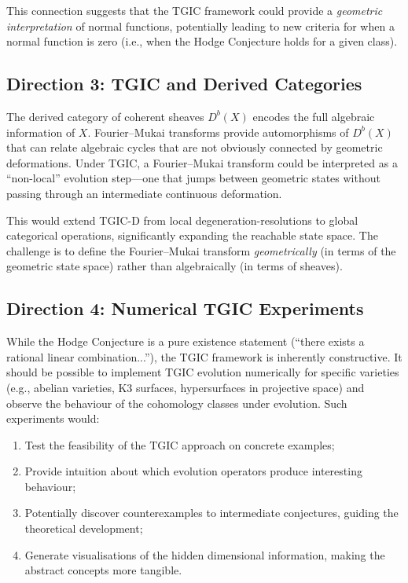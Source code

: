 \documentclass[11pt,a4paper]{article}
\theoremstyle{definition}
\theoremstyle{plain}
\begin{document}
This connection suggests that the TGIC framework could provide a \emph{geometric interpretation} of normal functions, potentially leading to new criteria for when a normal function is zero (i.e., when the Hodge Conjecture holds for a given class).

\subsection{Direction 3: TGIC and Derived Categories}

The derived category of coherent sheaves $D^b(X)$ encodes the full algebraic information of $X$. Fourier--Mukai transforms provide automorphisms of $D^b(X)$ that can relate algebraic cycles that are not obviously connected by geometric deformations. Under TGIC, a Fourier--Mukai transform could be interpreted as a ``non-local'' evolution step---one that jumps between geometric states without passing through an intermediate continuous deformation.

This would extend TGIC-D from local degeneration-resolutions to global categorical operations, significantly expanding the reachable state space. The challenge is to define the Fourier--Mukai transform \emph{geometrically} (in terms of the geometric state space) rather than algebraically (in terms of sheaves).

\subsection{Direction 4: Numerical TGIC Experiments}

While the Hodge Conjecture is a pure existence statement (``there exists a rational linear combination...''), the TGIC framework is inherently constructive. It should be possible to implement TGIC evolution numerically for specific varieties (e.g., abelian varieties, K3 surfaces, hypersurfaces in projective space) and observe the behaviour of the cohomology classes under evolution. Such experiments would:
\begin{enumerate}[nosep]
\item Test the feasibility of the TGIC approach on concrete examples;
\item Provide intuition about which evolution operators produce interesting behaviour;
\item Potentially discover counterexamples to intermediate conjectures, guiding the theoretical development;
\item Generate visualisations of the hidden dimensional information, making the abstract concepts more tangible.
\end{enumerate}
\end{document}
